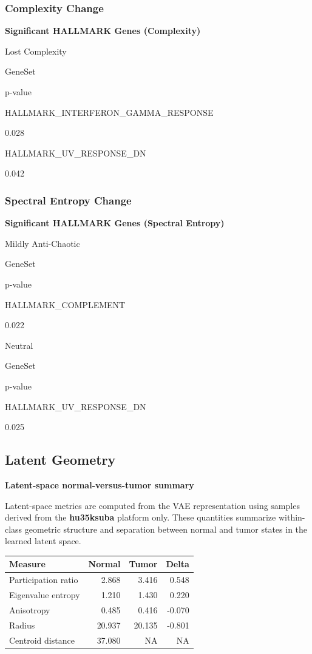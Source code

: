\documentclass[
  letterpaper,
  DIV=11,
  numbers=noendperiod,
  openany,
  oneside]{scrreprt}
\begin{document}
\subsubsection{Complexity Change}

\textbf{Significant HALLMARK Genes (Complexity)}

Lost Complexity

GeneSet

p-value

HALLMARK\_INTERFERON\_GAMMA\_RESPONSE

0.028

HALLMARK\_UV\_RESPONSE\_DN

0.042

\subsubsection{Spectral Entropy Change}

\textbf{Significant HALLMARK Genes (Spectral Entropy)}

Mildly Anti-Chaotic

GeneSet

p-value

HALLMARK\_COMPLEMENT

0.022

Neutral

GeneSet

p-value

HALLMARK\_UV\_RESPONSE\_DN

0.025

\subsection{Latent Geometry}

\textbf{Latent-space normal-versus-tumor summary}

Latent-space metrics are computed from the VAE representation using
samples derived from the \textbf{hu35ksuba} platform only. These
quantities summarize within-class geometric structure and separation
between normal and tumor states in the learned latent space.

\begin{longtable}[]{@{}lrrr@{}}
\toprule\noalign{}
Measure & Normal & Tumor & Delta \\
\midrule\noalign{}
\endhead
\bottomrule\noalign{}
\endlastfoot
Participation ratio & 2.868 & 3.416 & 0.548 \\
Eigenvalue entropy & 1.210 & 1.430 & 0.220 \\
Anisotropy & 0.485 & 0.416 & -0.070 \\
Radius & 20.937 & 20.135 & -0.801 \\
Centroid distance & 37.080 & NA & NA \\
\end{longtable}
\end{document}
